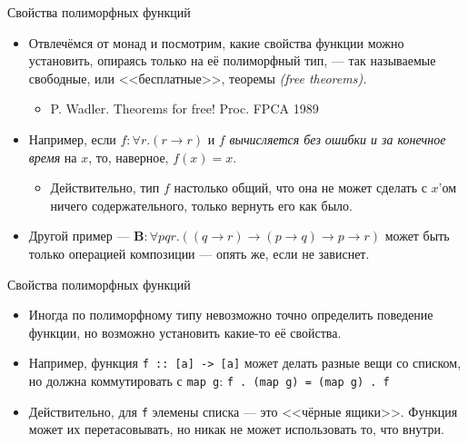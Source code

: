 \documentclass[xcolor=dvipsnames]{beamer}
\begin{document}
\begin{frame}{Свойства полиморфных функций}
 
 \begin{itemize}[<+->]
  \item Отвлечёмся от монад и посмотрим, какие свойства функции можно установить, опираясь только на её полиморфный тип, --- так называемые свободные, или <<бесплатные>>, теоремы {\em (free theorems).}
  \begin{itemize}
   \item P. Wadler. Theorems for free! Proc. FPCA 1989
  \end{itemize}
  \item Например, если $f \colon \forall r. (r \to r)$ и $f$ {\em вычисляется без ошибки и за конечное время} на $x$, то, наверное, $f(x) = x$.
  \begin{itemize}
   \item Действительно, тип $f$ настолько общий, что она не может сделать с $x$'ом ничего содержательного, только вернуть его как было.
  \end{itemize}
  \item Другой пример --- $\mathbf{B} \colon 
  \forall p q r . ((q \to r) \to (p \to q) \to p \to r)$ может быть только операцией композиции --- опять же, если не зависнет.
 \end{itemize}

 
\end{frame}

\begin{frame}[fragile]{Свойства полиморфных функций}
 
 \begin{itemize}[<+->]
  \item Иногда по полиморфному типу невозможно точно определить поведение функции, но возможно установить какие-то её свойства.
  \item Например, функция \texttt{f :: [a] -> [a]} может делать разные вещи со списком, но должна коммутировать с {\tt map g}:
  \texttt{f . (map g) = (map g) . f}
  \item Действительно, для {\tt f} элемены списка --- это <<чёрные ящики>>. Функция может их перетасовывать, но никак не может использовать то, что внутри.
 \end{itemize}

 
\end{frame}
\end{document}
